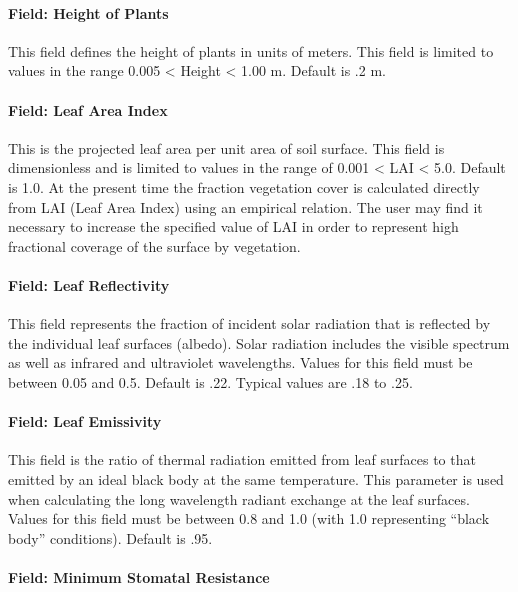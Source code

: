 \paragraph{Field: Height of Plants}\label{field-height-of-plants}

This field defines the height of plants in units of meters. This field is limited to values in the range 0.005 \textless{} Height \textless{} 1.00 m. Default is .2 m.

\paragraph{Field: Leaf Area Index}\label{field-leaf-area-index}

This is the projected leaf area per unit area of soil surface. This field is dimensionless and is limited to values in the range of 0.001 \textless{} LAI \textless{} 5.0. Default is 1.0. At the present time the fraction vegetation cover is calculated directly from LAI (Leaf Area Index) using an empirical relation. The user may find it necessary to increase the specified value of LAI in order to represent high fractional coverage of the surface by vegetation.

\paragraph{Field: Leaf Reflectivity}\label{field-leaf-reflectivity}

This field represents the fraction of incident solar radiation that is reflected by the individual leaf surfaces (albedo). Solar radiation includes the visible spectrum as well as infrared and ultraviolet wavelengths. Values for this field must be between 0.05 and 0.5. Default is .22. Typical values are .18 to .25.

\paragraph{Field: Leaf Emissivity}\label{field-leaf-emissivity}

This field is the ratio of thermal radiation emitted from leaf surfaces to that emitted by an ideal black body at the same temperature. This parameter is used when calculating the long wavelength radiant exchange at the leaf surfaces. Values for this field must be between 0.8 and 1.0 (with 1.0 representing ``black body'' conditions). Default is .95.

\paragraph{Field: Minimum Stomatal Resistance}\label{field-minimum-stomatal-resistance}


